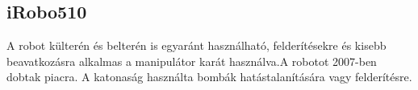 \renewcommand{\xname}{iRobo510}
\renewcommand{\x}{0.521}
\renewcommand{\y}{0.686}
\renewcommand{\z}{0.178}
\renewcommand{\weight}{20}
\renewcommand{\img}{MobilisRobotok/iRobo/iRobo510.jpg}
\renewcommand{\sources}{Forrás: https://www.army-technology.com}
\renewcommand{\captionn}{iRobo 510 lánctalpas packboot}
\renewcommand{\watherProf}{Igen -3m ig.}
\renewcommand{\sebesseg}{9.3}
\renewcommand{\weight}{10.89}
\renewcommand{\AcAndGy}{Igen}
\renewcommand{\GPS}{Igen}
\subsection*{iRobo510}
 A robot külterén és belterén is egyaránt használható, felderítésekre és kisebb beavatkozásra alkalmas a manipulátor karát használva.A robotot 2007-ben dobtak piacra. A katonaság használta bombák hatástalanítására vagy felderítésre. 

\renewcommand{\aspectratioPic}{0.5}



